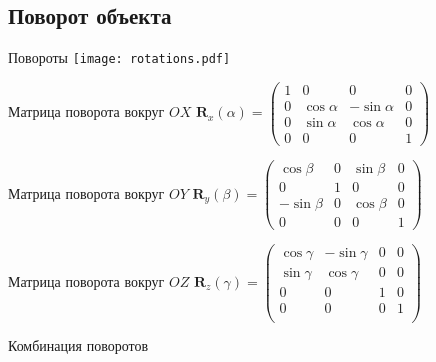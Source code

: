 \documentclass[10pt]{beamer}
\begin{document}
	
	\subsection{Поворот объекта}	
	
	\begin{frame}{Повороты}
		{
			\texttt{[image: rotations.pdf]}
		}
		{
			\begin{block}{Матрица поворота вокруг $OX$}
				\centering 
				$ \mathbf R_x(\alpha)
				 =
				 \begin{pmatrix}
				 	1&0&0&0\\
				 	0&\cos\alpha&-\sin\alpha&0\\
				 	0&\sin\alpha&\cos\alpha&0\\
				 	0&0&0&1				 	
				 \end{pmatrix}
				 $				
			\end{block}
			
			
		}
		
		{
			\begin{block}{Матрица поворота вокруг $OY$}
				\centering 
				$ \mathbf R_y(\beta)
				=
				\begin{pmatrix}
					\cos\beta&0&\sin\beta&0\\
					0&1&0&0\\
					-\sin\beta&0&\cos\beta &0\\
					0&0&0&1				 	
				\end{pmatrix}
				$				
			\end{block}
		}
		{
				\begin{block}{Матрица поворота вокруг $OZ$}
				\centering 
				$ \mathbf R_z(\gamma)
				=
				\begin{pmatrix}
					\cos\gamma&-\sin\gamma&0&0\\
					\sin\gamma&\cos\gamma&0&0\\
					0&0&1&0 \\
					0&0&0&1	\\			 	
				\end{pmatrix}
				$				
			\end{block}
		}
	\end{frame}
	
	\begin{frame}{Комбинация поворотов}
	\end{frame}
	
\end{document}
